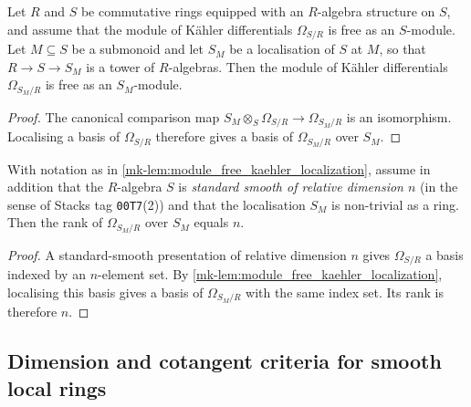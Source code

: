 \begin{lemma}\label{mk-lem:module_free_kaehler_localization}
  \leanok

  Let \(R\) and \(S\) be commutative rings equipped with an \(R\)-algebra
  structure on \(S\), and assume that the module of K\"ahler differentials
  \(\Omega_{S/R}\) is free as an \(S\)-module. Let \(M \subseteq S\) be a
  submonoid and let \(S_M\) be a localisation of \(S\) at \(M\), so that
  \(R \to S \to S_M\) is a tower of \(R\)-algebras. Then the module of
  K\"ahler differentials \(\Omega_{S_M / R}\) is free as an
  \(S_M\)-module.
\end{lemma}

\begin{proof}
  The canonical comparison map
  \(S_M \otimes_S \Omega_{S/R} \to \Omega_{S_M/R}\) is an isomorphism.
  Localising a basis of \(\Omega_{S/R}\) therefore gives a basis of
  \(\Omega_{S_M/R}\) over \(S_M\).
\end{proof}

\begin{lemma}\label{mk-lem:rank_kaehler_localization_eq_relative_dim}
  \leanok

  With notation as in \ref{mk-lem:module_free_kaehler_localization},
  assume in addition that the \(R\)-algebra \(S\) is \emph{standard
  smooth of relative dimension \(n\)} (in the sense of Stacks tag
  \texttt{00T7}(2)) and that
  the localisation \(S_M\) is non-trivial as a ring. Then the rank of
  \(\Omega_{S_M / R}\) over \(S_M\) equals \(n\).
\end{lemma}

\begin{proof}
  A standard-smooth presentation of relative dimension \(n\) gives
  \(\Omega_{S/R}\) a basis indexed by an \(n\)-element set.  By
  \ref{mk-lem:module_free_kaehler_localization}, localising this basis gives
  a basis of \(\Omega_{S_M/R}\) with the same index set.  Its rank is
  therefore \(n\).
\end{proof}

\subsection{Dimension and cotangent criteria for smooth local rings}
\label{mk-subsec:stage6_subgap_decomposition}

